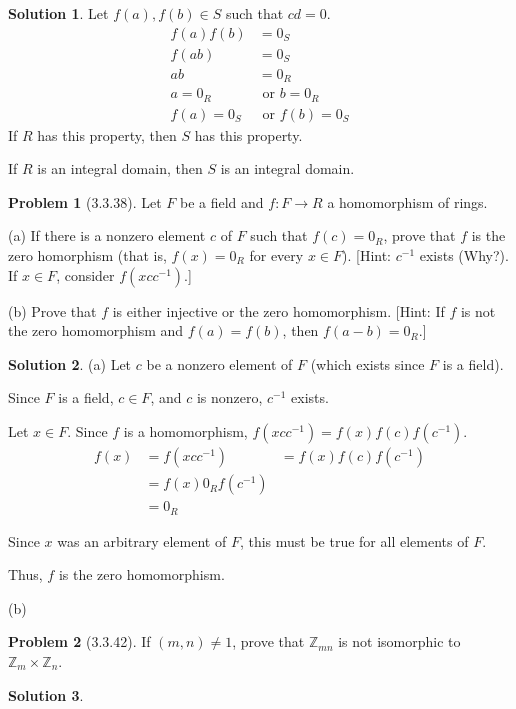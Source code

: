\documentclass[12pt]{article}
\theoremstyle{definition}
\newtheorem*{prob}{Problem}
\newtheorem*{soln}{Solution}
\newcommand{\ZZ}{{\mathbb{Z}}}
\begin{document}
\begin{soln}
Let $f(a),f(b)\in S$ such that $cd=0$.
\begin{align*}
f(a)f(b)&=0_S\\
f(ab)&=0_S\\
ab&=0_R\\
a=0_R&\text{ or }b=0_R\\
f(a)=0_S&\text{ or }f(b)=0_S
\end{align*}
If $R$ has this property, then $S$ has this property.

If $R$ is an integral domain, then $S$ is an integral domain.

\end{soln}

\begin{prob}[3.3.38]
Let $F$ be a field and $f:F \to R$ a homomorphism of  rings.     

(a)   If there is a nonzero element $c$ of  $F$ such that $f(c) = 0_R$, 
prove that $f$ is the zero homorphism (that is, $f(x) = 0_R$ for every $x\in F$). 
[Hint: $c^{-1}$ exists (Why?). If  $x\in F$, consider $f(xcc^{-1})$.]     

(b)   Prove that $f$ is either injective or the zero homomorphism. 
[Hint: If  $f$ is not the zero homomorphism and $f(a) = f(b)$, then $f(a - b) = 0_R$.]
\end{prob}

\begin{soln}\quad

(a) Let $c$ be a nonzero element of $F$ (which exists since $F$ is a field).

Since $F$ is a field, $c\in F$, and $c$ is nonzero, $c^{-1}$ exists.

Let $x\in F$.  Since $f$ is a homomorphism, $f(xcc^{-1})=f(x)f(c)f(c^{-1})$.
\begin{align*}
f(x)&=f(xcc^{-1})
&=f(x)f(c)f(c^{-1})\\
&=f(x)0_Rf(c^{-1})\\
&=0_R
\end{align*}

Since $x$ was an arbitrary element of $F$,
this must be true for all elements of $F$.

Thus, $f$ is the zero homomorphism.

(b) %

\end{soln}


\begin{prob}[3.3.42]
If  $(m, n) \neq 1$, prove that $\ZZ_{mn}$ is not isomorphic to $\ZZ_m \times \ZZ_n$.
\end{prob}

\begin{soln}

\end{soln}
\end{document}
